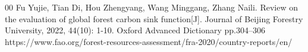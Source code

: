 \documentclass[12pt]{article}
\begin{document}
\newpage
\begin{thebibliography}{00}
Fu Yujie, Tian Di, Hou Zhengyang, Wang Minggang, Zhang Naili. Review on the evaluation of global forest carbon sink function[J]. Journal of Beijing Forestry University, 2022, 44(10): 1-10.
Oxford Advanced Dictionary pp.304--306 
https://www.fao.org/forest-resources-assessment/fra-2020/country-reports/en/
\end{thebibliography}
\end{document}
